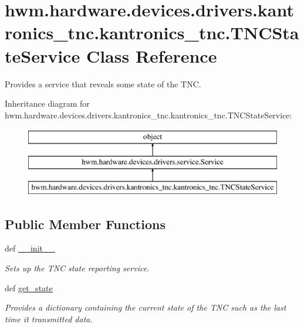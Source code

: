 \hypertarget{classhwm_1_1hardware_1_1devices_1_1drivers_1_1kantronics__tnc_1_1kantronics__tnc_1_1_t_n_c_state_service}{\section{hwm.\-hardware.\-devices.\-drivers.\-kantronics\-\_\-tnc.\-kantronics\-\_\-tnc.\-T\-N\-C\-State\-Service Class Reference}
\label{classhwm_1_1hardware_1_1devices_1_1drivers_1_1kantronics__tnc_1_1kantronics__tnc_1_1_t_n_c_state_service}
}


Provides a service that reveals some state of the T\-N\-C.  


Inheritance diagram for hwm.\-hardware.\-devices.\-drivers.\-kantronics\-\_\-tnc.\-kantronics\-\_\-tnc.\-T\-N\-C\-State\-Service\-:\begin{figure}[H]
\begin{center}
\leavevmode
\includegraphics[height=3.000000cm]{classhwm_1_1hardware_1_1devices_1_1drivers_1_1kantronics__tnc_1_1kantronics__tnc_1_1_t_n_c_state_service}
\end{center}
\end{figure}
\subsection*{Public Member Functions}
\begin{DoxyCompactItemize}
\item 
def \hyperlink{classhwm_1_1hardware_1_1devices_1_1drivers_1_1kantronics__tnc_1_1kantronics__tnc_1_1_t_n_c_state_service_ab8b363d3eb055125fb3b800bf5923b4a}{\-\_\-\-\_\-init\-\_\-\-\_\-}
\begin{DoxyCompactList}\small\item\em Sets up the T\-N\-C state reporting service. \end{DoxyCompactList}\item 
def \hyperlink{classhwm_1_1hardware_1_1devices_1_1drivers_1_1kantronics__tnc_1_1kantronics__tnc_1_1_t_n_c_state_service_a26fa7a4ef3421e78fb2235be9a43ae41}{get\-\_\-state}
\begin{DoxyCompactList}\small\item\em Provides a dictionary containing the current state of the T\-N\-C such as the last time it transmitted data. \end{DoxyCompactList}\end{DoxyCompactItemize}
